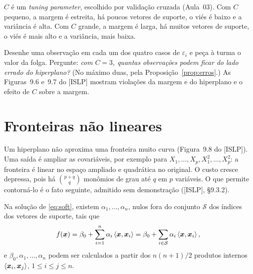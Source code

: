 \documentclass[11pt,a4paper]{article}
\begin{document}
\begin{ideia}
$C$ é um \emph{tuning parameter}, escolhido por validação cruzada (Aula~03). Com $C$
pequeno, a margem é estreita, há poucos vetores de suporte, o viés é baixo e a
variância é alta. Com $C$ grande, a margem é larga, há muitos vetores de suporte, o
viés é mais alto e a variância, mais baixa.
\end{ideia}

\begin{emsala}
Desenhe uma observação em cada um dos quatro casos de $\varepsilon_i$ e peça à turma
o valor da folga. Pergunte: \emph{com $C=3$, quantas observações podem ficar do lado
errado do hiperplano?} (No máximo duas, pela Proposição~\ref{prop:erros}.) As
Figuras~9.6 e~9.7 do [ISLP] mostram violações da margem e do hiperplano e o efeito
de $C$ sobre a margem.
\end{emsala}

\section{Fronteiras não lineares}
Um hiperplano não aproxima uma fronteira muito curva (Figura~9.8 do [ISLP]). Uma
saída é ampliar as covariáveis, por exemplo para $X_1,\dots,X_p,X_1^2,\dots,X_p^2$: a
fronteira é linear no espaço ampliado e quadrática no original. O custo cresce
depressa, pois há $\binom{p+q}{q}$ monômios de grau até $q$ em $p$ variáveis. O que
permite contorná-lo é o fato seguinte, admitido sem demonstração ([ISLP], §9.3.2).

\begin{proposicao}\label{prop:repr}
Na solução de \eqref{eq:soft}, existem $\alpha_1,\dots,\alpha_n$, nulos fora do
conjunto $\mathcal S$ dos índices dos vetores de suporte, tais que
\begin{equation}\label{eq:repr}
  f(\bm{x})=\beta_0+\sum_{i=1}^n\alpha_i\left\langle \bm{x}, \bm{x}_i \right\rangle
       =\beta_0+\sum_{i\in\mathcal S}\alpha_i\left\langle \bm{x}, \bm{x}_i \right\rangle,
\end{equation}
e $\beta_0,\alpha_1,\dots,\alpha_n$ podem ser calculados a partir dos $n(n+1)/2$
produtos internos $\left\langle \bm{x}_i, \bm{x}_j \right\rangle$, $1\le i\le j\le n$.
\end{proposicao}

\end{document}
